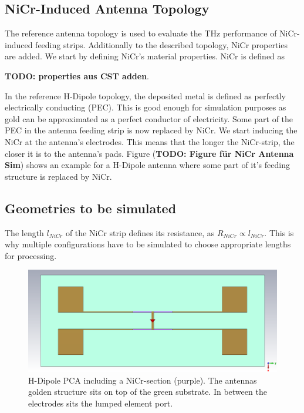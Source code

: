\subsection{NiCr-Induced Antenna Topology}
The reference antenna topology is used to evaluate the THz performance of NiCr-induced feeding strips. Additionally to the described topology, NiCr properties are added. We start by defining NiCr's material properties. NiCr is defined as 

\textbf{TODO: properties aus CST adden}.

In the reference H-Dipole topology, the deposited metal is defined as perfectly electrically conducting (PEC). This is good enough for simulation purposes as gold can be approximated as a perfect conductor of electricity. Some part of the PEC in the antenna feeding strip is now replaced by NiCr. We start inducing the NiCr at the antenna's electrodes. This means that the longer the NiCr-strip, the closer it is to the antenna's pads. Figure (\textbf{TODO: Figure für NiCr Antenna Sim}) shows an example for a H-Dipole antenna where some part of it's feeding structure is replaced by NiCr. 



\subsection{Geometries to be simulated}
The length $l_{NiCr}$ of the NiCr strip defines its resistance, as $R_{NiCr} \propto l_{NiCr}$. This is why multiple configurations have to be simulated to choose appropriate lengths for processing. 

\begin{figure}[ht]
    \centering
    \includegraphics[width=\linewidth]{figures/H_Dipole_NiCr copy.png}
    \caption{H-Dipole PCA including a NiCr-section (purple). The antennas golden structure sits on top of the green substrate. In between the electrodes sits the lumped element port.}
    \label{ref_h_dipole_for_sim}
\end{figure}
